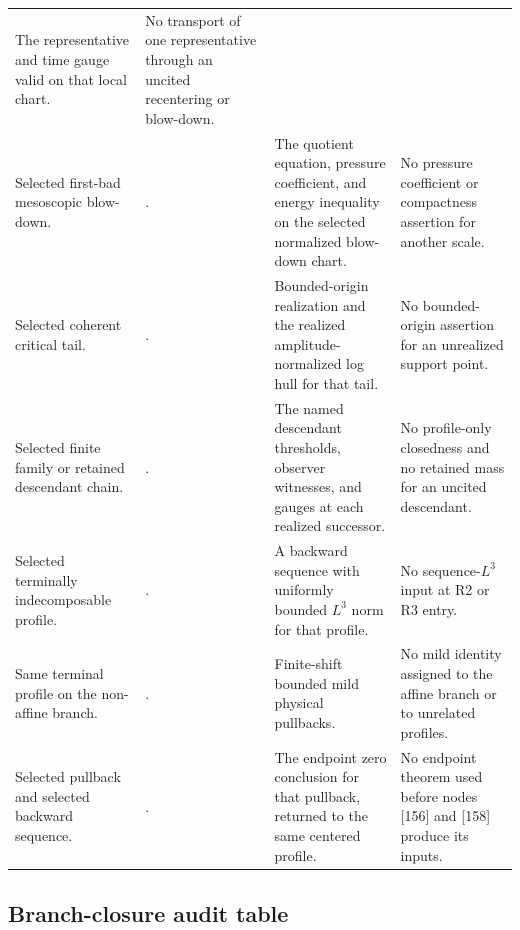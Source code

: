 \documentclass[11pt]{amsart}
\numberwithin{equation}{section}
\theoremstyle{plain}
\theoremstyle{definition}
\theoremstyle{remark}
\begin{document}
\begin{longtable}{@{}L{0.18\textwidth}L{0.25\textwidth}L{0.29\textwidth}L{0.20\textwidth}@{}}
The representative and time gauge valid on that local chart. &
No transport of one representative through an uncited recentering or
blow-down.\\
Selected first-bad mesoscopic blow-down. &
. &
The quotient equation, pressure coefficient, and energy inequality on the
selected normalized blow-down chart. &
No pressure coefficient or compactness assertion for another scale.\\
Selected coherent critical tail. &
. &
Bounded-origin realization and the realized amplitude-normalized log hull for
that tail. &
No bounded-origin assertion for an unrealized support point.\\
Selected finite family or retained descendant chain. &
. &
The named descendant thresholds, observer witnesses, and gauges at each
realized successor. &
No profile-only closedness and no retained mass for an uncited descendant.\\
Selected terminally indecomposable profile. &
. &
A backward sequence with uniformly bounded \(L^3\) norm for that profile. &
No sequence-\(L^3\) input at R2 or R3 entry.\\
Same terminal profile on the non-affine branch. &
. &
Finite-shift bounded mild physical pullbacks. &
No mild identity assigned to the affine branch or to unrelated profiles.\\
Selected pullback and selected backward sequence. &
. &
The endpoint zero conclusion for that pullback, returned to the same centered
profile. &
No endpoint theorem used before nodes [156] and [158] produce its inputs.\\
\hline
\end{longtable}
\endgroup

\subsection{Branch-closure audit table}
\end{document}

